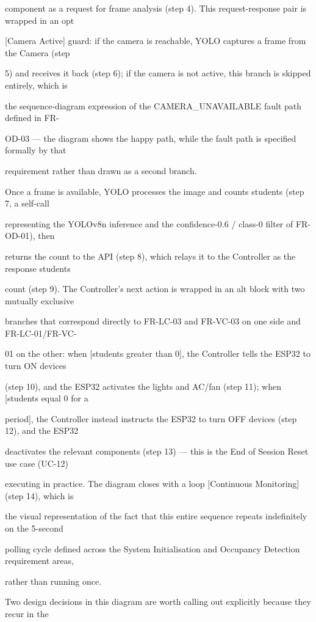 component as a request for frame analysis (step 4). This request-response pair is wrapped in an opt

	[Camera Active] guard: if the camera is reachable, YOLO captures a frame from the Camera (step

5) and receives it back (step 6); if the camera is not active, this branch is skipped entirely, which is

the sequence-diagram expression of the CAMERA\_UNAVAILABLE fault path defined in FR-

OD-03 --- the diagram shows the happy path, while the fault path is specified formally by that

requirement rather than drawn as a second branch.

Once a frame is available, YOLO processes the image and counts students (step 7, a self-call

representing the YOLOv8n inference and the confidence-0.6 / class-0 filter of FR-OD-01), then

returns the count to the API (step 8), which relays it to the Controller as the response students

count (step 9). The Controller's next action is wrapped in an alt block with two mutually exclusive

branches that correspond directly to FR-LC-03 and FR-VC-03 on one side and FR-LC-01/FR-VC-

01 on the other: when [students greater than 0], the Controller tells the ESP32 to turn ON devices

(step 10), and the ESP32 activates the lights and AC/fan (step 11); when [students equal 0 for a

		period], the Controller instead instructs the ESP32 to turn OFF devices (step 12), and the ESP32

deactivates the relevant components (step 13) --- this is the End of Session Reset use case (UC-12)

executing in practice. The diagram closes with a loop [Continuous Monitoring] (step 14), which is

the visual representation of the fact that this entire sequence repeats indefinitely on the 5-second

polling cycle defined across the System Initialisation and Occupancy Detection requirement areas,

rather than running once.

Two design decisions in this diagram are worth calling out explicitly because they recur in the

